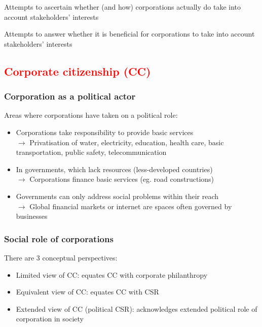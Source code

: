 \documentclass{article}
\DeclareRobustCommand{\k}[1]{\textcolor{red}{#1}}
\begin{document}
Attempts to ascertain whether (and how) corporations actually do take
into account stakeholders' interests

Attempts to answer whether it is beneficial for corporations to take
into account stakeholders' interests

\subsection{\k{Corporate citizenship (CC)}}
\subsubsection{Corporation as a political actor}
Areas where corporations have taken on a political role:
\begin{itemize}
    \item Corporations take responsibility to provide basic services\\
    $\to$ Privatisation of water, electricity, education, health care, basic transportation, public safety, telecommunication
    \item In governments, which lack resources (less-developed countries)\\
    $\to$ Corporations finance basic services (eg. road constructions)
    \item Governments can only address social problems within their reach\\
    $\to$ Global financial markets or internet are spaces often governed by businesses
\end{itemize}

\subsubsection{Social role of corporations}
There are 3 conceptual perspectives:
\begin{itemize}
    \item Limited view of CC: equates CC with corporate philanthropy
    \item Equivalent view of CC: equates CC with CSR
    \item Extended view of CC (political CSR): acknowledges extended political role of corporation in society
\end{itemize}
\end{document}
